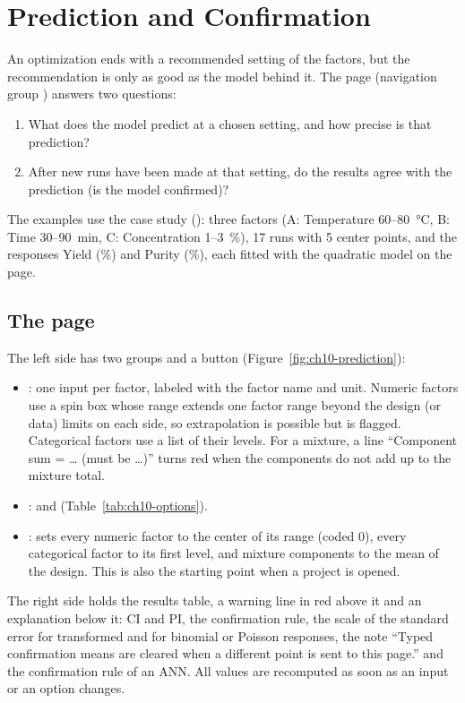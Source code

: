 \chapter{Prediction and Confirmation}\label{sec:ch10-prediction}\label{chap:10}

An optimization ends with a recommended setting of the factors, but the recommendation is only as good as the model
behind it. The  page (navigation group ) answers two questions:
\begin{enumerate}
  \item What does the model predict at a chosen setting, and how precise is that prediction?
  \item After new runs have been made at that setting, do the results agree with the prediction (is the model
    confirmed)?
\end{enumerate}
The examples use the case study  (): three factors (A: Temperature 60--80~°C, B: Time 30--90~min, C: Concentration 1--3~\%), 17 runs
with 5 center points, and the responses Yield (\%) and Purity (\%), each fitted with the quadratic model on the
 page.

\section{The page}\label{sec:ch10-page}

The left side has two groups and a button (Figure~\ref{fig:ch10-prediction}):
\begin{itemize}
  \item {}: one input per factor, labeled with the factor name and unit. Numeric
    factors use a spin box whose range extends one factor range beyond the design (or data) limits on each side,
    so extrapolation is possible but is flagged. Categorical factors use a list of their levels. For a mixture, a
    line ``Component sum = \dots{} (must be \dots)'' turns red when the components do not add up to the mixture
    total.
  \item {}:  and 
    (Table~\ref{tab:ch10-options}).
  \item {}: sets every numeric factor to the center of its range (coded 0), every
    categorical factor to its first level, and mixture components to the mean of the design. This is also the
    starting point when a project is opened.
\end{itemize}
The right side holds the results table, a warning line in red above it and an explanation below it: CI and PI,
the confirmation rule, the scale of the standard error for transformed and for binomial or Poisson responses, the
note ``Typed confirmation means are cleared when a different point is sent to this page.'' and the confirmation rule
of an ANN. All values are recomputed as soon as an input or an option changes.

